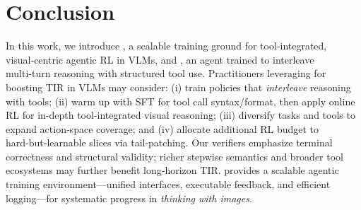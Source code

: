 \section{Conclusion}
\label{sec:conclusion}
In this work, we introduce \env{}, a scalable training ground for tool‑integrated, visual‑centric agentic RL in VLMs, and \ours{}, an agent trained to interleave multi‑turn reasoning with structured tool use. 
Practitioners leveraging \env{} for boosting TIR in VLMs may consider: (i) train policies that \emph{interleave} reasoning with tools; (ii) warm up with SFT for tool call syntax/format, then apply online RL for in-depth tool-integrated visual reasoning; (iii) diversify tasks and tools to expand action‑space coverage; and (iv) allocate additional RL budget to hard‑but‑learnable slices via tail‑patching. 
Our verifiers emphasize terminal correctness and structural validity; richer stepwise semantics and broader tool ecosystems may further benefit long‑horizon TIR. 
\env{} provides a scalable agentic training environment—unified interfaces, executable feedback, and efficient logging—for systematic progress in \emph{thinking with images}. 